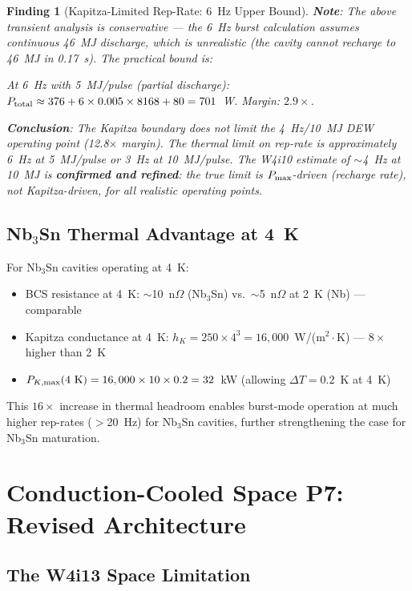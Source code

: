 \documentclass[11pt]{article}
\newtheorem{finding}{Finding}
\begin{document}
\begin{finding}[Kapitza-Limited Rep-Rate: 6~Hz Upper Bound]
\textbf{Note}: The above transient analysis is conservative ---
the 6~Hz burst calculation assumes continuous 46~MJ discharge, which
is unrealistic (the cavity cannot recharge to 46~MJ in 0.17~s). The
practical bound is:

At 6~Hz with 5~MJ/pulse (partial discharge):
$P_{\rm total} \approx 376 + 6 \times 0.005 \times 8168 + 80 = 701$~W.
Margin: $2.9\times$.

\textbf{Conclusion}: The Kapitza boundary does not limit the
4~Hz/10~MJ DEW operating point (12.8$\times$ margin). The thermal
limit on rep-rate is approximately 6~Hz at 5~MJ/pulse or 3~Hz at
10~MJ/pulse. The W4i10 estimate of $\sim$4~Hz at 10~MJ is
\textbf{confirmed and refined}: the true limit is
$P_{\rm max}$-driven (recharge rate), not Kapitza-driven, for
all realistic operating points.
\end{finding}

\subsection{Nb$_3$Sn Thermal Advantage at 4~K}

For Nb$_3$Sn cavities operating at 4~K:
\begin{itemize}[nosep]
  \item BCS resistance at 4~K: $\sim$10~n$\Omega$ (Nb$_3$Sn)
    vs.\ $\sim$5~n$\Omega$ at 2~K (Nb) --- comparable
  \item Kapitza conductance at 4~K: $h_K = 250 \times 4^3
    = 16,000$~W/(m$^2\cdot$K) --- $8\times$ higher than 2~K
  \item $P_{K,\rm max}(4~\text{K}) = 16,000 \times 10 \times 0.2
    = 32$~kW (allowing $\Delta T = 0.2$~K at 4~K)
\end{itemize}

This $16\times$ increase in thermal headroom enables burst-mode
operation at much higher rep-rates ($>$20~Hz) for Nb$_3$Sn cavities,
further strengthening the case for Nb$_3$Sn maturation.

\section{Conduction-Cooled Space P7: Revised Architecture}
\label{sec:space-conduction}

\subsection{The W4i13 Space Limitation}
\end{document}
